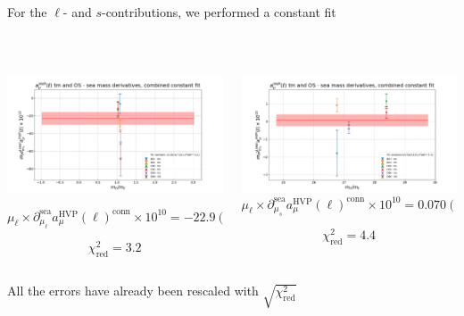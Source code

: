 \documentclass[xcolor={dvipsnames,table}]{beamer}
\begin{document}
\begin{frame}
  \centering
  For the $\ell$- and $s$-contributions, we performed a constant fit

  \

  \begin{columns}
    \begin{column}{0.5\textwidth}
      \includegraphics[trim=0cm 0.3cm 0cm 1.2cm, clip,width=\textwidth]{plots/der_mq_sea_lore/fit_amu_der_ml_full.png}

      $$\mu_\ell\times\partial^\mathrm{sea}_{\mu_\ell}a^\mathrm{HVP}_\mu(\ell)^\mathrm{conn}\times10^{10} = -22.9(7.0)$$

      $$\chi^2_\mathrm{red}=3.2$$
    \end{column}
    \begin{column}{0.5\textwidth}
      \includegraphics[trim=0cm 0.3cm 0cm 1.2cm, clip,width=\textwidth]{plots/der_mq_sea_lore/fit_amu_der_ms_full.png}
      $$\mu_\ell\times\partial^\mathrm{sea}_{\mu_s}a^\mathrm{HVP}_\mu(\ell)^\mathrm{conn}\times10^{10} = 0.070(325)$$

      $$\chi^2_\mathrm{red}=4.4$$
    \end{column}
  \end{columns}
  All the errors have already been rescaled with $\sqrt{\chi^2_\mathrm{red}}$
\end{frame}
\end{document}
